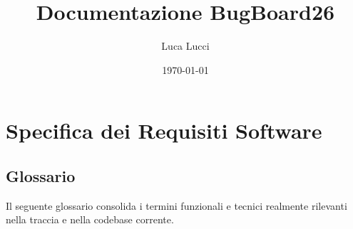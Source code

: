 ﻿\documentclass[11pt,a4paper]{article}
\title{Documentazione BugBoard26}
\author{Luca Lucci}
\date{\today}
\begin{document}
\maketitle

\tableofcontents
\newpage

\section{Specifica dei Requisiti Software}

\subsection{Glossario}
Il seguente glossario consolida i termini funzionali e tecnici realmente rilevanti nella traccia e nella codebase corrente.
\end{document}
